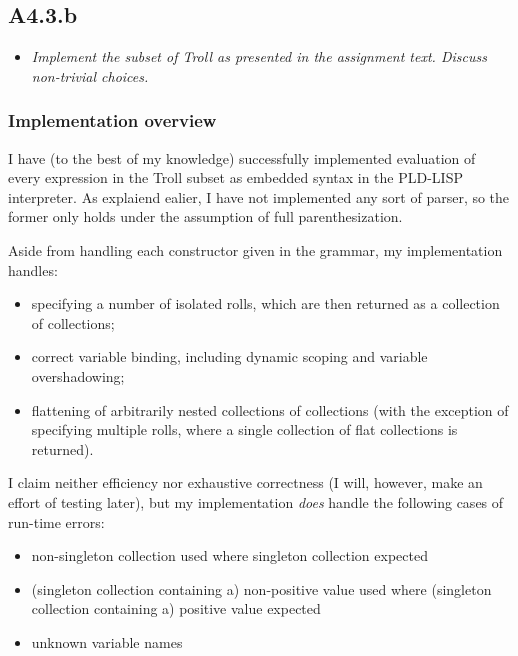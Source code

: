 \newpage
\subsection{A4.3.b}

\begin{itemize}
  \item \emph{Implement the subset of Troll as presented in the assignment text.
    Discuss non-trivial choices.}
\end{itemize}

\subsubsection{Implementation overview}

I have (to the best of my knowledge) successfully implemented evaluation of
every expression in the Troll subset as embedded syntax in the PLD-LISP
interpreter. As explaiend ealier, I have not implemented any sort of parser, so
the former only holds under the assumption of full parenthesization.

\smallskip

Aside from handling each constructor given in the grammar, my implementation
handles:

\begin{itemize}
  \item specifying a number of isolated rolls, which are then returned as a
    collection of collections;
  \item correct variable binding, including dynamic scoping and variable
    overshadowing;
  \item flattening of arbitrarily nested collections of collections (with the
    exception of specifying multiple rolls, where a single collection of flat
    collections is returned).
\end{itemize}

I claim neither efficiency nor exhaustive correctness (I will, however, make an
effort of testing later), but my implementation \emph{does} handle the following
cases of run-time errors:

\begin{itemize}
  \item non-singleton collection used where singleton collection expected
  \item (singleton collection containing a) non-positive value used where (singleton
    collection containing a) positive value expected
  \item unknown variable names
\end{itemize}

